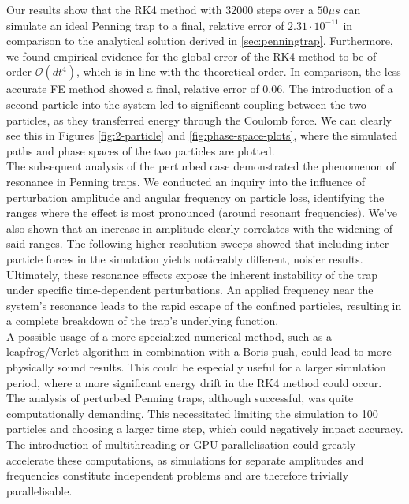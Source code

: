 Our results show that the RK4 method with 32000 steps over a $50 \mu s$ can simulate an ideal Penning trap to a final, relative error of $2.31 \cdot 10^{-11}$ in comparison to the analytical solution derived in \cref{sec:penningtrap}.
Furthermore, we found empirical evidence for the global error of the RK4 method to be of order $\mathcal{O}(dt^4)$, which is in line with the theoretical order. In comparison, the less accurate FE method showed a final, relative error of 0.06. 
The introduction of a second particle into the system led to significant coupling between the two particles, as they transferred energy through the Coulomb force. We can clearly see this in Figures \ref{fig:2-particle} and \ref{fig:phase-space-plots}, where the simulated paths and phase spaces of the two particles are plotted.\\
The subsequent analysis of the perturbed case demonstrated the phenomenon of resonance in Penning traps. We conducted an inquiry into the influence of perturbation amplitude and angular frequency on particle loss, identifying the ranges where the effect is most pronounced (around resonant frequencies). We've also shown that an increase in amplitude clearly correlates with the widening of said ranges. The following higher-resolution sweeps showed that including inter-particle forces in the simulation yields noticeably different, noisier results.
Ultimately, these resonance effects expose the inherent instability of the trap under specific time-dependent perturbations.
An applied frequency near the system's resonance leads to the rapid escape of the confined particles, resulting in a complete breakdown of the trap's underlying function. \\
A possible usage of a more specialized numerical method, such as a leapfrog/Verlet algorithm in combination with a Boris push, could lead to more physically sound results\cite{LectureNotes}. This could be especially useful for a larger simulation period, where a more significant energy drift in the RK4 method could occur. \\
The analysis of perturbed Penning traps, although successful, was quite computationally demanding. This necessitated limiting the simulation to 100 particles and choosing a larger time step, which could negatively impact accuracy. The introduction of multithreading or GPU-parallelisation could greatly accelerate these computations, as simulations for separate amplitudes and frequencies constitute independent problems and are therefore trivially parallelisable.

